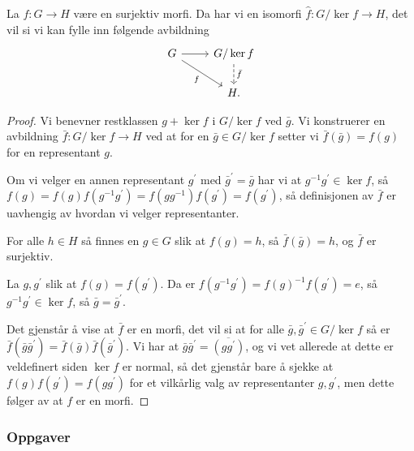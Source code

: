 \begin{theorem}[Isomorfiteoremet]\label{thm:isomorphism-theorem}
    La $f\colon G\to H$ være en surjektiv morfi.
    Da har vi en isomorfi $\hat f\colon G / \ker f \to H$,
    det vil si vi kan fylle inn følgende avbildning
    \[\begin{tikzcd}
        G
        \rar
        \drar[swap]{f}
        &
        G / \ker f
        \dar[dashed]{\bar f}
        \\
        &
        H.
    \end{tikzcd}\]
\end{theorem}
\begin{proof}
    Vi benevner restklassen $g + \ker f$ i $G / \ker f$
    ved $\bar g$.
    Vi konstruerer en avbildning $\bar f\colon G / \ker f\to H$
    ved at for en $\bar g\in G / \ker f$ setter vi
    $\bar f(\bar g) = f(g)$ for en representant $g$.

    Om vi velger en annen representant $g^\prime$ med
    $\bar g^\prime = \bar g$ har vi at $g^{-1}g^\prime\in\ker f$,
    så $f(g) = f(g)f(g^{-1}g^\prime) = f(gg^{-1})f(g^\prime) = f(g^\prime)$,
    så definisjonen av $\bar f$ er uavhengig av hvordan vi velger representanter.

    For alle $h\in H$ så finnes en $g\in G$ slik at $f(g) = h$,
    så $\bar f(\bar g) = h$, og $\bar f$ er surjektiv.

    La $g, g^\prime$ slik at $f(g) = f(g^\prime)$.
    Da er $f(g^{-1}g^\prime) = f(g)^{-1} f(g^\prime) = e$,
    så $g^{-1}g^\prime\in \ker f$, så $\bar g = \bar g^\prime$.

    Det gjenstår å vise at $\bar f$ er en morfi,
    det vil si at for alle $\bar g, \bar g^\prime \in G / \ker f$
    så er $\bar f(\bar g\bar g^\prime) = \bar f(\bar g)\bar f(\bar g^\prime)$.
    Vi har at $\bar g\bar g^\prime = \overline{(gg^\prime)}$,
    og vi vet allerede at dette er veldefinert siden $\ker f$ er normal,
    så det gjenstår bare å sjekke at $f(g)f(g^\prime) = f(gg^\prime)$
    for et vilkårlig valg av representanter $g, g^\prime$,
    men dette følger av at $f$ er en morfi.
\end{proof}

\subsubsection*{Oppgaver}


